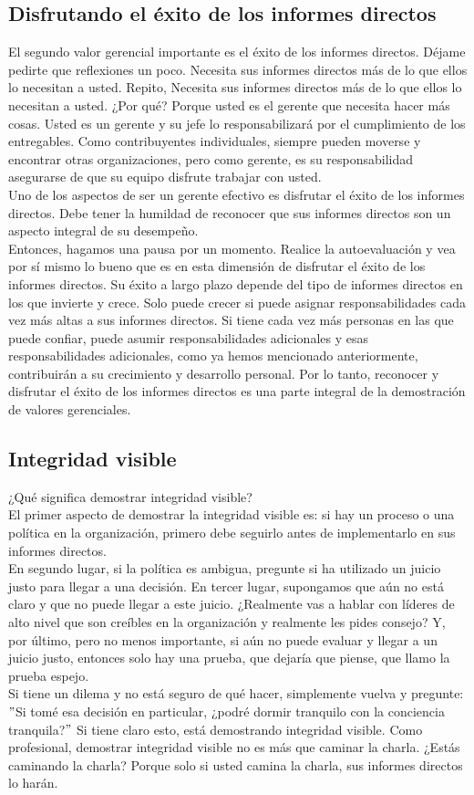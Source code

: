 \documentclass[10pt]{book}
\begin{document}
\subsection{Disfrutando el éxito de los informes directos}
El segundo valor gerencial importante es el éxito de los informes directos. Déjame pedirte que reflexiones un poco. Necesita sus informes directos más de lo que ellos lo necesitan a usted. Repito, Necesita sus informes directos más de lo que ellos lo necesitan a usted. ¿Por qué? Porque usted es el gerente que necesita hacer más cosas. Usted es un gerente y su jefe lo responsabilizará por el cumplimiento de los entregables. Como contribuyentes individuales, siempre pueden moverse y encontrar otras organizaciones, pero como gerente, es su responsabilidad asegurarse de que su equipo disfrute trabajar con usted.\\
Uno de los aspectos de ser un gerente efectivo es disfrutar el éxito de los informes directos. Debe tener la humildad de reconocer que sus informes directos son un aspecto integral de su desempeño.\\
Entonces, hagamos una pausa por un momento. Realice la autoevaluación y vea por sí mismo lo bueno que es en esta dimensión de disfrutar el éxito de los informes directos. Su éxito a largo plazo depende del tipo de informes directos en los que invierte y crece. Solo puede crecer si puede asignar responsabilidades cada vez más altas a sus informes directos. Si tiene cada vez más personas en las que puede confiar, puede asumir responsabilidades adicionales y esas responsabilidades adicionales, como ya hemos mencionado anteriormente, contribuirán a su crecimiento y desarrollo personal. Por lo tanto, reconocer y disfrutar el éxito de los informes directos es una parte integral de la demostración de valores gerenciales.
\subsection{Integridad visible}
¿Qué significa demostrar integridad visible?\\
El primer aspecto de demostrar la integridad visible es: si hay un proceso o una política en la organización, primero debe seguirlo antes de implementarlo en sus informes directos.\\
En segundo lugar, si la política es ambigua, pregunte si ha utilizado un juicio justo para llegar a una decisión. En tercer lugar, supongamos que aún no está claro y que no puede llegar a este juicio. ¿Realmente vas a hablar con líderes de alto nivel que son creíbles en la organización y realmente les pides consejo? Y, por último, pero no menos importante, si aún no puede evaluar y llegar a un juicio justo, entonces solo hay una prueba, que dejaría que piense, que llamo la prueba espejo.\\
Si tiene un dilema y no está seguro de qué hacer, simplemente vuelva y pregunte: $"$Si tomé esa decisión en particular, ¿podré dormir tranquilo con la conciencia tranquila?$"$ Si tiene claro esto, está demostrando integridad visible. Como profesional, demostrar integridad visible no es más que caminar la charla. ¿Estás caminando la charla? Porque solo si usted camina la charla, sus informes directos lo harán.
\end{document}
